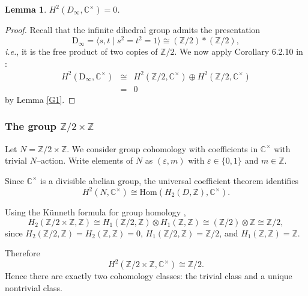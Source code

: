 \documentclass[11pt]{amsart}
\newtheorem{lemma}[theorem]{Lemma}
\theoremstyle{remark}
\theoremstyle{definition}
\newcommand{\Z}{\mathbb{Z}}
\newcommand{\C}{\mathbb{C}}
\begin{document}
\begin{lemma}\label{G2}
$H^2(D_\infty,\mathbb{C}^\times)=0$.
\end{lemma}
\begin{proof}
Recall that the infinite dihedral group admits the presentation
\[
\mathrm{D}_\infty=\langle s,t \mid s^2=t^2=1\rangle \cong (\Z/2)\ast(\Z/2),
\]
\textit{i.e.}, it is the free product of two copies of $\Z/2$.
We now apply Corollary 6.2.10 in \cite{W}: 
\begin{eqnarray*}
H^2(\mathrm{D}_\infty,\mathbb{C}^\times) & \cong & H^2(\Z/2,\mathbb{C}^\times)\oplus H^2(\Z/2,\mathbb{C}^\times)\\
& = &0
\end{eqnarray*}
by Lemma \ref{G1}. 
\end{proof}

\subsubsection{The group $\Z/2\times \Z$}   Let $N= \Z/2 \times \Z$.    We consider group cohomology with coefficients in $\C^\times$ with trivial
$N$--action.  Write elements of $N$ as $(\varepsilon,m)$ with $\varepsilon\in\{0,1\}$ and $m\in\Z$.

Since $\C^\times$ is a divisible abelian group, the universal coefficient
theorem identifies
\[
H^2(N,\C^\times)\cong \mathrm{Hom}(H_2(D,\Z),\C^\times).
\]

Using the K\"unneth formula for group homology \cite[\S3.5]{W}, 
\[
H_2(\Z/2\times \Z,\Z)
\cong H_1(\Z/2,\Z)\otimes H_1(\Z,\Z)
\cong (\Z/2)\otimes \Z
\cong \Z/2,
\]
since $H_2(\Z/2,\Z)=H_2(\Z,\Z)=0$,
$H_1(\Z/2,\Z)=\Z/2$, and $H_1(\Z,\Z)=\Z$.

Therefore
\[
\boxed{
H^2(\Z/2\times \Z,\C^\times)\cong \Z/2.
}
\]
Hence there are exactly two cohomology classes: the trivial class and a unique
nontrivial class.

\end{document}
